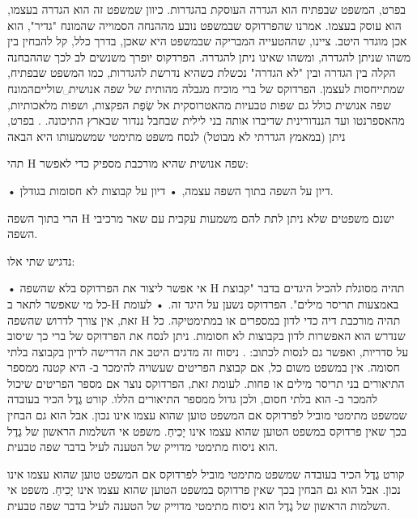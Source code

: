 בפרט, המשפט שבפתיח הוא הגדרה העוסקת בהגדרות. כיוון שמשפט זה הוא הגדרה בעצמו, הוא עוסק בעצמו. אמרנו שהפרדוקס שבמשפט נובע מההנחה הסמוייה שהמונח "גדיר", הוא אכן מוגדר היטב. ציינו, שההטעייה המבריקה שבמשפט היא שאכן, בדרך כלל, קל להבחין בין משהו שניתן להגדרה, ומשהו שאינו ניתן להגדרה. הפרדקוס יופרך משנשים לב לכך שההבחנה הקלה בין הגדרה ובין "לא הגדרה" נכשלת כשהיא נדרשת להגדרות, כמו המשפט שבפתיח, שמתייחסות לעצמן. הפרדוקס של ברי מוכיח מגבלה מהותית של שפה אנושית␣שוליים{המונח שפה אנושית כולל גם שפות טבעיות מהאטרוסקית אל שְׂפַת הפקצות, ושפות מלאכותיות, מהאספרנטו ועד הננדורינית שדיברו אותה בני לילית שבחבל ננדור שבארץ התיכונה.
}. בפרט, ניתן (במאמץ הגדרתי לא מבוטל) לנסח משפט מתימטי שמשמעותו היא הבאה

\begin{mybox}
תהי H שפה אנושית שהיא מורכבת מספיק כדי לאפשר:
\begin{itemize}
• דיון על השפה בתוך השפה עצמה,
• דיון על קבוצות לא חסומות בגודלן.
\end{itemize}
הרי בתוך השפה H ישנם משפטים שלא ניתן לתת להם משמעות עקבית עם שאר מרכיבי השפה.
\end{mybox}

נדגיש שתי אלו:
\begin{itemize}
• אי אפשר ליצור את הפרדוקס בלא שהשפה H תהיה מסוגלת להכיל היגדים בדבר "קבוצת כל מי שאפשר לתאר ב-H באמצעות תריסר מילים". הפרדוקס נשען על היגד זה.
• לעומת זאת, אין צורך לדרוש שהשפה H תהיה מורכבת דיה כדי לדון במספרים או במתימטיקה. כל שנדרש הוא האפשרות לדון בקבוצות לא חסומות. ניתן לנסח את הפרדוקס של ברי כך שיסוב על סדריות, ואפשר גם לנסות לכתוב: . ניסוח זה מדגים היטב את הדרישה לדיון בקבוצה בלתי חסומה. אין במשפט משום כל, אם קבוצת הפריטים שעשויה להימכר ב- היא קטנה ממספר התיאורים בני תריסר מילים או פחות. לעומת זאת, הפרדוקס נוצר אם מספר הפריטים שיכול להמכר ב- הוא בלתי חסום, ולכן גדול ממספר התיאורים הללו.
קורט גֶדֶל הכיר בעובדה שמשפט מתימטי מוביל לפרדוקס אם המשפט טוען שהוא עצמו אינו נכון. אבל הוא גם הבחין בכך שאין פרדוקס במשפט הטוען שהוא עצמו אינו יָכִיחַ. משפט אי השלמות הראשון של גֶדֶל הוא ניסוח מתימטי מדוייק של הטענה לעיל בדבר שפה טבעית.
\end{itemize}

קורט גֶדֶל הכיר בעובדה שמשפט מתימטי מוביל לפרדוקס אם המשפט טוען שהוא עצמו אינו נכון. אבל הוא גם הבחין בכך שאין פרדוקס במשפט הטוען שהוא עצמו אינו יָכִיחַ. משפט אי השלמות הראשון של גֶדֶל הוא ניסוח מתימטי מדוייק של הטענה לעיל בדבר שפה טבעית.

